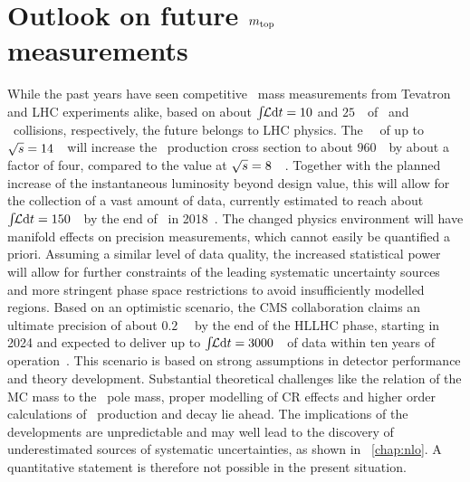 \section[Outlook on future \mt\ measurements]{Outlook on future \boldmath$m_{\mathrm{top}}$ measurements}
%
While the past years have seen competitive \tquark\ mass measurements from Tevatron and \gls{LHC} experiments alike, based on about $\int\!\!{\mathcal L}\mathrm{d}t=10$ and $25$~\invfb\ of \ppbar\ and \pp\ collisions, respectively, the future belongs to \gls{LHC} physics. 
%
The \RunTwo\ \cmes\ of up to ${\sqrt{s}}=14$~\TeV\ will increase the \ttbar\ production cross section to about $960$~\pb\ by about a factor of four, compared to the value at ${\sqrt{s}}=8$~\TeV~\cite{CAC-1101}. Together with the planned increase of the instantaneous luminosity beyond design value, this will allow for the collection of a vast amount of data, currently estimated to reach about $\int\!\!{\mathcal L}\mathrm{d}t=150$~\invfb\ by the end of \RunTwo\ in 2018~\cite{RossiHLLHC}. 
%
The changed physics environment will have manifold effects on precision measurements, which cannot easily be quantified a priori. Assuming a similar level of data quality, the increased statistical power will allow for further constraints of the leading systematic uncertainty sources and more stringent phase space restrictions to avoid insufficiently modelled regions. 
%
Based on an optimistic scenario, the \gls{CMS} collaboration claims an ultimate precision of about $0.2$~\GeV~\cite{CMS-PAS-FTR-13-017} by the end of the \gls{HLLHC} phase, starting in 2024 and expected to deliver up to $\int\!\!{\mathcal L}\mathrm{d}t=3000$~\invfb\ of data within ten years of operation~\cite{CAC-1101}. This scenario is based on strong assumptions in detector performance and theory development. 
%
Substantial theoretical challenges like the relation of the \gls{MC} mass to the \tquark\ pole mass, proper modelling of \gls{CR} effects and higher order calculations of \ttbar\ production and decay lie ahead. 
%
The implications of the developments are unpredictable and may well lead to the discovery of underestimated sources of systematic uncertainties, as shown in \chap~\ref{chap:nlo}.
%
A quantitative statement is therefore not possible in the present situation.
































